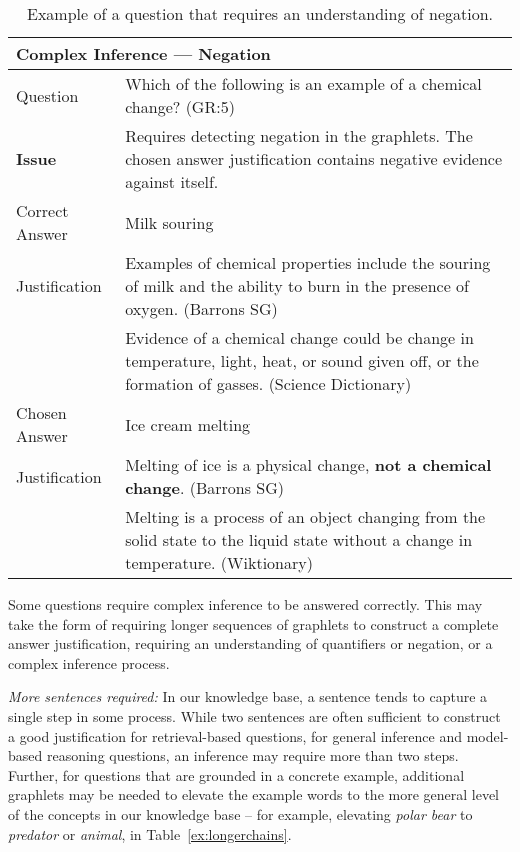 \begin{table}[]
\caption{{  Example of a question that requires an understanding of negation. }} 
\begin{footnotesize}
\begin{tabularx}{\textwidth}{p{2.5cm}p{10cm}}
\hline
\multicolumn{2}{l}{Complex Inference --- Negation} \\
\hline
Question & Which of the following is an example of a chemical change? (GR:5)  \\
\textbf{Issue}			&  Requires detecting negation in the graphlets.  The chosen answer justification contains negative evidence against itself. \\
\hline
Correct Answer &  Milk souring\\
Justification 	& Examples of chemical properties include the souring of milk and the ability to burn in the presence of oxygen. (Barrons SG)\\
 				& Evidence of a chemical change could be change in temperature, light, heat, or sound given off, or the formation of gasses. (Science Dictionary)\\
\hline
Chosen Answer & Ice cream melting\\
Justification 	& Melting of ice is a physical change, {\bf not a chemical change}. (Barrons SG)\\
 	& Melting is a process of an object changing from the solid state to the liquid state without a change in temperature. (Wiktionary)\\
\hline
\end{tabularx}
\end{footnotesize}
\label{ex:negations}

\end{table}



{}
Some questions require complex inference to be answered correctly.  This may take the form of requiring longer sequences of graphlets to construct a complete answer justification, requiring an understanding of quantifiers or negation, or a complex inference process. 

{\flushleft \emph{More sentences required: }}
In our knowledge base, a sentence tends to capture a single step in some process. While two sentences are often sufficient to construct a good justification for retrieval-based questions, for general inference and model-based reasoning questions, an inference may require more than two steps.  Further, for questions that are grounded in a concrete example, additional graphlets may be needed to elevate the example words to the more general level of the concepts in our knowledge base -- for example, elevating \emph{polar bear} to \emph{predator} or \emph{animal}, in Table~\ref{ex:longerchains}. 

